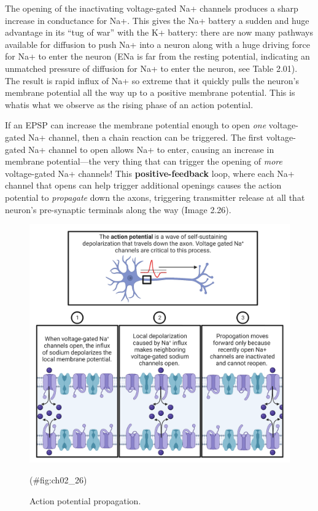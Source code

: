 \documentclass[
]{book}
\begin{document}
The opening of the inactivating voltage-gated Na+ channels produces a sharp increase in conductance for Na+. This gives the Na+ battery a sudden and huge advantage in its ``tug of war'' with the K+ battery: there are now many pathways available for diffusion to push Na+ into a neuron along with a huge driving force for Na+ to enter the neuron (ENa is far from the resting potential, indicating an unmatched pressure of diffusion for Na+ to enter the neuron, see Table 2.01). The result is rapid influx of Na+ so extreme that it quickly pulls the neuron's membrane potential all the way up to a positive membrane potential. This is whatis what we observe as the rising phase of an action potential.

If an EPSP can increase the membrane potential enough to open \emph{one} voltage-gated Na+ channel, then a chain reaction can be triggered. The first voltage-gated Na+ channel to open allows Na+ to enter, causing an increase in membrane potential---the very thing that can trigger the opening of \emph{more} voltage-gated Na+ channels! This \textbf{positive-feedback} loop, where each Na+ channel that opens can help trigger additional openings causes the action potential to \emph{propagate} down the axons, triggering transmitter release at all that neuron's pre-synaptic terminals along the way (Image 2.26).

\begin{figure}

{\centering \includegraphics[width=0.8\linewidth]{images/ch02/02_26} 

}

\caption{Action potential propagation.}(\#fig:ch02_26)
\end{figure}
\end{document}
